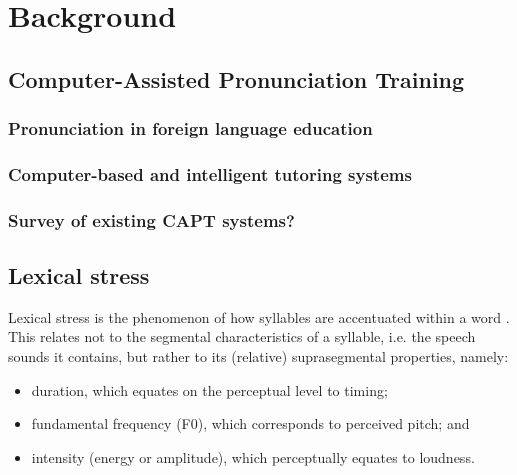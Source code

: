 %
%
\chapter{Background%
}
\label{chap:background}





\section{Computer-Assisted Pronunciation Training} %
\label{sec:bkgd:capt}


	\subsection{Pronunciation in foreign language education}
	\label{sec:capt:l2ed}


	\subsection{Computer-based and intelligent tutoring systems} 
	\label{sec:capt:its}
	
	\subsection{Survey of existing CAPT systems?}
	\label{sec:capt:systems}
	
 \section{Lexical stress}
 \label{sec:bkgd:stress}
			Lexical stress is the phenomenon of how syllables are accentuated within a word  \citep{Cutler2005}. This relates not to the segmental characteristics of a syllable, i.e. the speech sounds it contains, but rather to its (relative) suprasegmental properties, namely: %
			\begin{itemize}
			\item duration, which equates on the perceptual level to timing;
			\item fundamental frequency (F0), which corresponds to perceived pitch; and
			\item intensity (energy or amplitude), which perceptually equates to loudness.
			\end{itemize}

